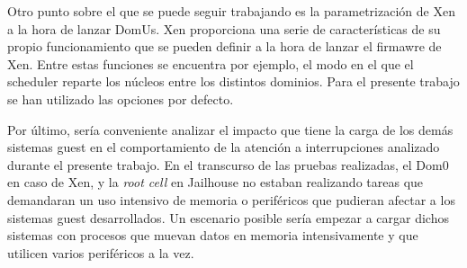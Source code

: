 Otro punto sobre el que se puede seguir trabajando es la parametrización de Xen a la hora de lanzar DomUs. Xen proporciona una serie de características de su propio funcionamiento que se pueden definir a la hora de lanzar el firmawre de Xen. Entre estas funciones se encuentra por ejemplo, el modo en el que el scheduler reparte los núcleos entre los distintos dominios. Para el presente trabajo se han utilizado las opciones por defecto.

Por último, sería conveniente analizar el impacto que tiene la carga de los demás sistemas guest en el comportamiento de la atención a interrupciones analizado durante el presente trabajo. En el transcurso de las pruebas realizadas, el Dom0 en caso de Xen, y la \textit{root cell} en Jailhouse no estaban realizando tareas que demandaran un uso intensivo de memoria o periféricos que pudieran afectar a los sistemas guest desarrollados. Un escenario posible sería empezar a cargar dichos sistemas con procesos que muevan datos en memoria intensivamente y que utilicen varios periféricos a la vez.
